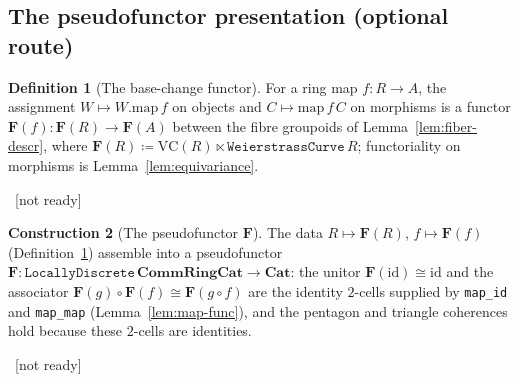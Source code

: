 \documentclass[11pt]{article}
\newcommand{\lean}[1]{\par\smallskip\noindent{\footnotesize\texttt{Lean:\ #1}}\par}
\newcommand{\uses}[1]{}
\newcommand{\notready}{{\footnotesize\textcolor{red!60!black}{\ [not ready]}}}
\theoremstyle{definition}
\newtheorem{definition}{Definition}[section]
\newtheorem{construction}[definition]{Construction}
\theoremstyle{plain}
\theoremstyle{remark}
\newcommand{\CRingCat}{\mathbf{CommRingCat}}
\newcommand{\Cat}{\mathbf{Cat}}
\newcommand{\VC}{\mathrm{VC}}
\newcommand{\id}{\mathrm{id}}
\newcommand{\map}{\mathrm{map}}
\begin{document}
\subsection{The pseudofunctor presentation (optional route)}

\begin{definition}[The base-change functor]\label{def:F-map}
For a ring map $f:R\to A$, the assignment $W\mapsto W.\map\,f$ on objects and
$C\mapsto\map\,f\,C$ on morphisms is a functor
$\mathbf F(f):\mathbf F(R)\to\mathbf F(A)$ between the fibre groupoids of
Lemma~\ref{lem:fiber-descr}, where
$\mathbf F(R)\coloneqq\VC(R)\ltimes\texttt{WeierstrassCurve}\,R$; functoriality on
morphisms is Lemma~\ref{lem:equivariance}.
\lean{}\notready
\uses{lem:fiber-descr,def:vc-map,lem:equivariance}
\end{definition}

\begin{construction}[The pseudofunctor $\mathbf F$]\label{con:pseudofunctor}
The data $R\mapsto\mathbf F(R)$, $f\mapsto\mathbf F(f)$
(Definition~\ref{def:F-map}) assemble into a pseudofunctor
$\mathbf F:\mathtt{LocallyDiscrete}\,\CRingCat\to\Cat$: the unitor
$\mathbf F(\id)\cong\mathrm{id}$ and the associator
$\mathbf F(g)\circ\mathbf F(f)\cong\mathbf F(g\circ f)$ are the identity $2$-cells
supplied by \texttt{map\_id} and \texttt{map\_map} (Lemma~\ref{lem:map-func}), and
the pentagon and triangle coherences hold because these $2$-cells are identities.
\lean{}\notready
\uses{def:F-map,lem:map-func}
\end{construction}
\end{document}
